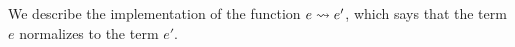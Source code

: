 We describe the implementation of the function $e \leadsto e'$, which says that the term $e$ normalizes to the term $e'$.
